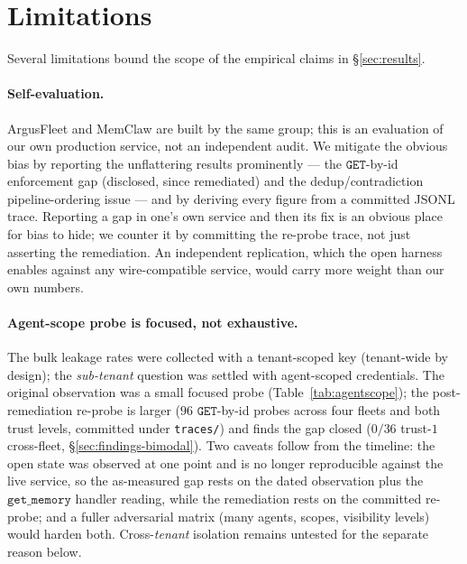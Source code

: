 \documentclass[10pt,twocolumn,letterpaper]{article}
\begin{document}
\section{Limitations}
\label{sec:limitations}

Several limitations bound the scope of the empirical claims in \S\ref{sec:results}.

\paragraph{Self-evaluation.}
ArgusFleet and MemClaw are built by the same group; this is an evaluation of our own production service, not an independent audit. We mitigate the obvious bias by reporting the unflattering results prominently --- the \(\mathtt{GET}\)-by-id enforcement gap (disclosed, since remediated) and the dedup/contradiction pipeline-ordering issue --- and by deriving every figure from a committed JSONL trace. Reporting a gap in one's own service and then its fix is an obvious place for bias to hide; we counter it by committing the re-probe trace, not just asserting the remediation. An independent replication, which the open harness enables against any wire-compatible service, would carry more weight than our own numbers.

\paragraph{Agent-scope probe is focused, not exhaustive.}
The bulk leakage rates were collected with a tenant-scoped key (tenant-wide by design); the \emph{sub-tenant} question was settled with agent-scoped credentials. The original observation was a small focused probe (Table~\ref{tab:agentscope}); the post-remediation re-probe is larger (\(96\) \(\mathtt{GET}\)-by-id probes across four fleets and both trust levels, committed under \texttt{traces/}) and finds the gap closed (\(0/36\) trust-\(1\) cross-fleet, \S\ref{sec:findings-bimodal}). Two caveats follow from the timeline: the open state was observed at one point and is no longer reproducible against the live service, so the as-measured gap rests on the dated observation plus the \(\mathtt{get\_memory}\) handler reading, while the remediation rests on the committed re-probe; and a fuller adversarial matrix (many agents, scopes, visibility levels) would harden both. Cross-\emph{tenant} isolation remains untested for the separate reason below.
\end{document}
